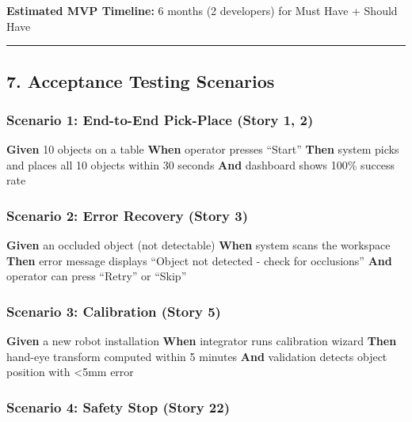 \documentclass[
]{article}
\begin{document}
\textbf{Estimated MVP Timeline:} 6 months (2 developers) for Must Have +
Should Have

\begin{center}\rule{0.5\linewidth}{0.5pt}\end{center}

\hypertarget{acceptance-testing-scenarios}{%
\subsection{7. Acceptance Testing
Scenarios}\label{acceptance-testing-scenarios}}

\hypertarget{scenario-1-end-to-end-pick-place-story-1-2}{%
\subsubsection{Scenario 1: End-to-End Pick-Place (Story 1,
2)}\label{scenario-1-end-to-end-pick-place-story-1-2}}

\textbf{Given} 10 objects on a table \textbf{When} operator presses
``Start'' \textbf{Then} system picks and places all 10 objects within 30
seconds \textbf{And} dashboard shows 100\% success rate

\hypertarget{scenario-2-error-recovery-story-3}{%
\subsubsection{Scenario 2: Error Recovery (Story
3)}\label{scenario-2-error-recovery-story-3}}

\textbf{Given} an occluded object (not detectable) \textbf{When} system
scans the workspace \textbf{Then} error message displays ``Object not
detected - check for occlusions'' \textbf{And} operator can press
``Retry'' or ``Skip''

\hypertarget{scenario-3-calibration-story-5}{%
\subsubsection{Scenario 3: Calibration (Story
5)}\label{scenario-3-calibration-story-5}}

\textbf{Given} a new robot installation \textbf{When} integrator runs
calibration wizard \textbf{Then} hand-eye transform computed within 5
minutes \textbf{And} validation detects object position with
\textless5mm error

\hypertarget{scenario-4-safety-stop-story-22}{%
\subsubsection{Scenario 4: Safety Stop (Story
22)}\label{scenario-4-safety-stop-story-22}}
\end{document}
